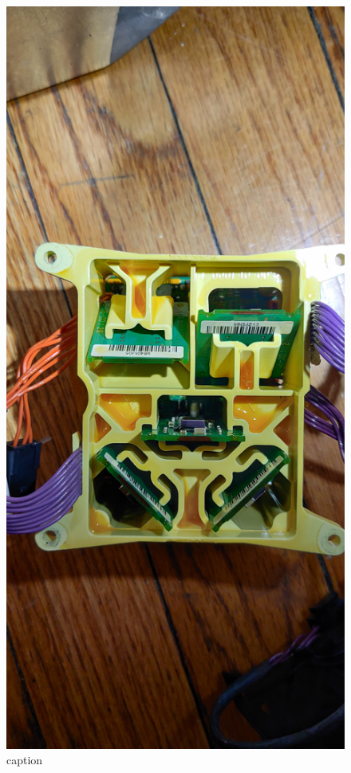 \documentclass[]{formalLabReport}
\begin{document}
\begin{figure}
    \includegraphics[]{segwayGyroCubeTop.jpg}
    \caption{caption}
    \label{fig:segwayGyroCubeTop.jpg}
\end{figure}
\end{document}

